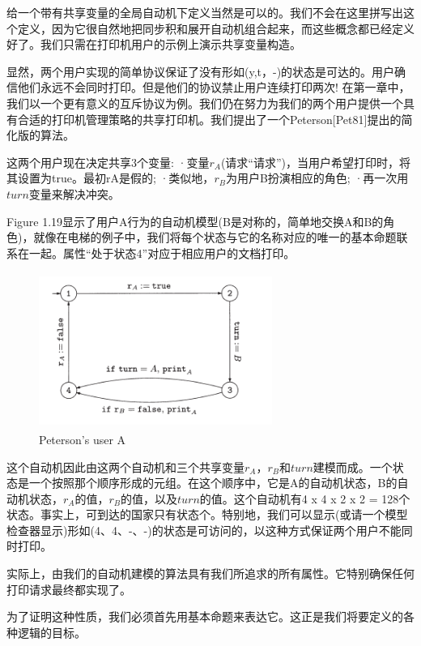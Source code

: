 \documentclass{book}
\begin{document}
    给一个带有共享变量的全局自动机下定义当然是可以的。我们不会在这里拼写出这个定义，因为它很自然地把同步积和展开自动机组合起来，而这些概念都已经定义好了。我们只需在打印机用户的示例上演示共享变量构造。
    
    显然，两个用户实现的简单协议保证了没有形如(y,t，-)的状态是可达的。用户确信他们永远不会同时打印。但是他们的协议禁止用户连续打印两次!
    在第一章中，我们以一个更有意义的互斥协议为例。我们仍在努力为我们的两个用户提供一个具有合适的打印机管理策略的共享打印机。我们提出了一个Peterson[Pet81]提出的简化版的算法。
    
    这两个用户现在决定共享3个变量:
    ·变量$r_A$(请求“请求”)，当用户希望打印时，将其设置为true。最初rA是假的;
    ·类似地，$r_B$为用户B扮演相应的角色;
    ·再一次用$turn$变量来解决冲突。
    
    Figure 1.19显示了用户A行为的自动机模型(B是对称的，简单地交换A和B的角色)，就像在电梯的例子中，我们将每个状态与它的名称对应的唯一的基本命题联系在一起。属性“处于状态4”对应于相应用户的文档打印。
    \begin{figure}
    \centering
    \includegraphics[height=2in,width=3.0in]{1_19.png}
    \caption{Peterson's user A}
    \end{figure}

    这个自动机因此由这两个自动机和三个共享变量$r_A$，$r_B$和$turn$建模而成。一个状态是一个按照那个顺序形成的元组。在这个顺序中，它是A的自动机状态，B的自动机状态，$r_A$的值，$r_B$的值，以及$turn$的值。这个自动机有4 x 4 x 2 x 2 = 128个状态。事实上，可到达的国家只有状态个。特别地，我们可以显示(或请一个模型检查器显示)形如(4、4、-、-)的状态是可访问的，以这种方式保证两个用户不能同时打印。

    实际上，由我们的自动机建模的算法具有我们所追求的所有属性。它特别确保任何打印请求最终都实现了。

    为了证明这种性质，我们必须首先用基本命题来表达它。这正是我们将要定义的各种逻辑的目标。
\end{document}

